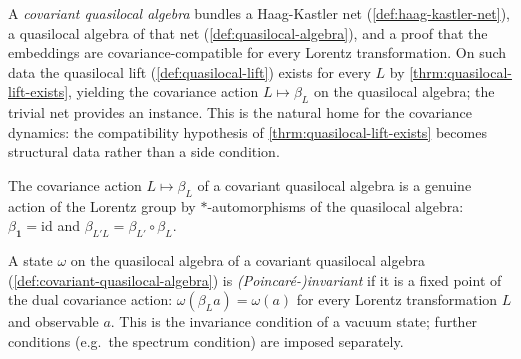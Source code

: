 \begin{definition}
    \label{def:covariant-quasilocal-algebra}
    \leanok
    A \emph{covariant quasilocal algebra} bundles a Haag-Kastler net (\ref{def:haag-kastler-net}), a quasilocal algebra of that net (\ref{def:quasilocal-algebra}), and a proof that the embeddings are covariance-compatible for every Lorentz transformation. On such data the quasilocal lift (\ref{def:quasilocal-lift}) exists for every $L$ by \ref{thrm:quasilocal-lift-exists}, yielding the covariance action $L \mapsto \beta_L$ on the quasilocal algebra; the trivial net provides an instance. This is the natural home for the covariance dynamics: the compatibility hypothesis of \ref{thrm:quasilocal-lift-exists} becomes structural data rather than a side condition.
\end{definition}

\begin{lemma}
    \label{lmm:quasilocal-action-coherence}
    \leanok
    The covariance action $L \mapsto \beta_L$ of a covariant quasilocal algebra is a genuine action of the Lorentz group by $*$-automorphisms of the quasilocal algebra: $\beta_{\mathbf{1}} = \mathrm{id}$ and $\beta_{L'L} = \beta_{L'} \circ \beta_L$.
\end{lemma}

\begin{definition}
    \label{def:invariant-state}
    \leanok
    A state $\omega$ on the quasilocal algebra of a covariant quasilocal algebra (\ref{def:covariant-quasilocal-algebra}) is \emph{(Poincar\'e-)invariant} if it is a fixed point of the dual covariance action: $\omega(\beta_L a) = \omega(a)$ for every Lorentz transformation $L$ and observable $a$. This is the invariance condition of a vacuum state; further conditions (e.g.\ the spectrum condition) are imposed separately.
\end{definition}

